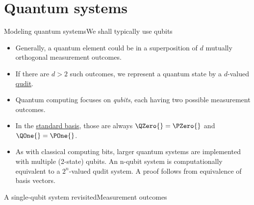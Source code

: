 \section{Quantum systems}

\begin{frame}{Modeling quantum systems}{We shall typically use qubits}
\begin{itemize}
    \item<1-> Generally, a quantum element could be in a superposition of $d$ mutually orthogonal measurement outcomes.
    \item<2-> If there are $d>2$ such outcomes, we represent a quantum state by a $d$-valued 
    \href{https://en.wiktionary.org/wiki/qudit}{qudit}. 
    \item<4-> Quantum computing focuses on \emph{qubits}, each having two possible measurement outcomes.
    \item<5-> In the \href{https://en.wikipedia.org/wiki/Qubit\#Qubit_states}{standard basis}, those are always $\QZero{}=\PZero{}$ and $\QOne{} = \POne{}$.
    \item<6-> As with classical computing bits, larger quantum systems are implemented with multiple (2-state) qubits. An n-qubit system is computationally equivalent to a $2^{n}$-valued qudit system. A proof follows from equivalence of basis vectors.
\end{itemize}
\end{frame}

\begin{frame}{A single-qubit system revisited}{Measurement outcomes}
\end{frame}

